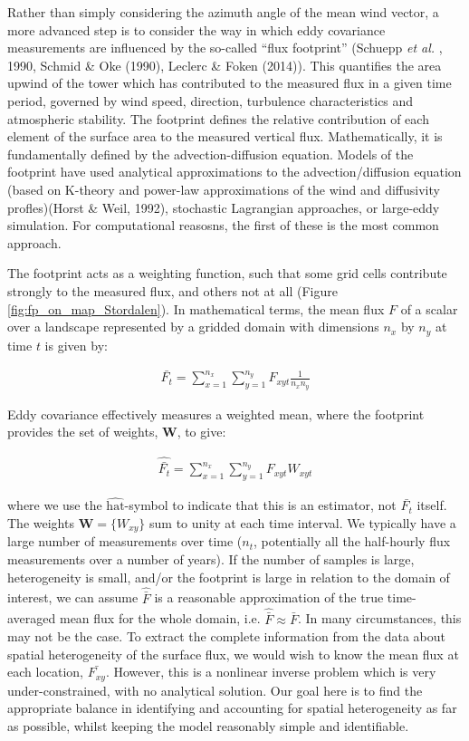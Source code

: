 Rather than simply considering the azimuth angle of the mean wind
vector, a more advanced step is to consider the way in which eddy
covariance measurements are influenced by the so-called ``flux
footprint'' (Schuepp \emph{et al.} , 1990, Schmid \& Oke (1990), Leclerc
\& Foken (2014)). This quantifies the area upwind of the tower which has
contributed to the measured flux in a given time period, governed by
wind speed, direction, turbulence characteristics and atmospheric
stability. The footprint defines the relative contribution of each
element of the surface area to the measured vertical flux.
Mathematically, it is fundamentally defined by the advection-diffusion
equation. Models of the footprint have used analytical approximations to
the advection/diffusion equation (based on K-theory and power-law
approximations of the wind and diffusivity profles)(Horst \& Weil,
1992), stochastic Lagrangian approaches, or large-eddy simulation. For
computational reasosns, the first of these is the most common approach.

The footprint acts as a weighting function, such that some grid cells
contribute strongly to the measured flux, and others not at all (Figure
\ref{fig:fp_on_map_Stordalen}). In mathematical terms, the mean flux
\(F\) of a scalar over a landscape represented by a gridded domain with
dimensions \(n_x\) by \(n_y\) at time \(t\) is given by:

\begin{align}
   \label{eq:simpleMean} 
  \bar{F_t} = \sum_{x = 1}^{n_x} \sum_{y = 1}^{n_y} F_{xyt} \frac{1}{n_x n_y}

\end{align}

Eddy covariance effectively measures a weighted mean, where the
footprint provides the set of weights, \(\mathbf{W}\), to give:

\begin{align}
   \label{eq:weightMean} 
  \widehat{\bar{F_t}} = \sum_{x = 1}^{n_x} \sum_{y = 1}^{n_y} F_{xyt} W_{xyt}

\end{align}

where we use the \(\widehat{\mathrm{hat}}\)-symbol to indicate that this
is an estimator, not \(\bar{F_t}\) itself. The weights
\(\mathbf{W} = \{W_{xy}\}\) sum to unity at each time interval. We
typically have a large number of measurements over time (\(n_t\),
potentially all the half-hourly flux measurements over a number of
years). If the number of samples is large, heterogeneity is small,
and/or the footprint is large in relation to the domain of interest, we
can assume \(\widehat{\bar{F}}\) is a reasonable approximation of the
true time-averaged mean flux for the whole domain, i.e.
\(\widehat{\bar{F}} \approx \bar{F}\). In many circumstances, this may
not be the case. To extract the complete information from the data about
spatial heterogeneity of the surface flux, we would wish to know the
mean flux at each location, \(\bar{F_{xy}}\). However, this is a
nonlinear inverse problem which is very under-constrained, with no
analytical solution. Our goal here is to find the appropriate balance in
identifying and accounting for spatial heterogeneity as far as possible,
whilst keeping the model reasonably simple and identifiable.

